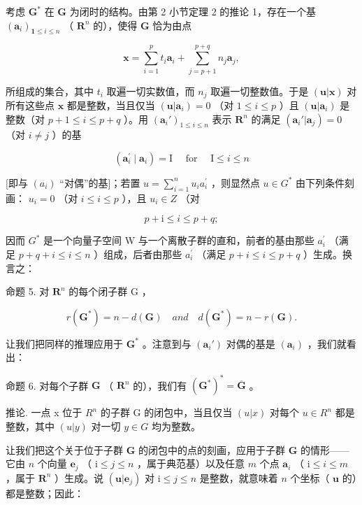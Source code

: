 考虑 \(\mathbf{G}^*\) 在 \(\mathbf{G}\) 为闭时的结构。由第 2 小节定理 2 的推论 1，存在一个基 \((\pmb{a}_i)_{\mathbf{1} \leqslant i \leqslant n}\) （ \(\mathbf{R}^n\) 的），使得 \(\mathbf{G}\) 恰为由点

\[
\boldsymbol {x} = \sum_ {i = 1} ^ {p} t _ {i} \boldsymbol {a} _ {i} + \sum_ {j = p + 1} ^ {p + q} n _ {j} \boldsymbol {a} _ {j},
\]

所组成的集合，其中 \(t_i\) 取遍一切实数值，而 \(n_j\) 取遍一切整数值。于是 \((\boldsymbol{u}|\boldsymbol{x})\) 对所有这些点 \(\boldsymbol{x}\) 都是整数，当且仅当 \((\boldsymbol{u}|\boldsymbol{a}_i) = 0\) （对 \(1 \leqslant i \leqslant p\) ）且 \((\boldsymbol{u}|\boldsymbol{a}_i)\) 是整数（对 \(p + 1 \leqslant i \leqslant p + q\) ）。用 \((\boldsymbol{a}_i')_{1 \leqslant i \leqslant n}\) 表示 \(\mathbf{R}^n\) 的满足 \((\boldsymbol{a}_i'|\boldsymbol{a}_j) = 0\) （对 \(i \neq j\) ）的基

\[
\left(\boldsymbol {a} _ {i} ^ {\prime} \mid \boldsymbol {a} _ {i}\right) = \mathrm{I} \quad \text { for } \quad \mathrm{I} \leqslant i \leqslant n
\]

{[}即与 \((a_{i})\) “对偶”的基{]}；若置 \(u = \sum_{i=1}^{n} u_{i} a_{i}^{\prime}\) ，则显然点 \(u \in G^{*}\) 由下列条件刻画： \(u_{i} = 0\) （对 \(i \leqslant i \leqslant p\) ），且 \(u_{i} \in Z\) （对

\[
p + \mathrm{i} \leqslant i \leqslant p + q;
\]

因而 \(G^{*}\) 是一个向量子空间 W 与一个离散子群的直和，前者的基由那些 \(a_{i}^{\prime}\) （满足 \(p + q + i \leqslant i \leqslant n\) ）组成，后者由那些 \(a_{i}^{\prime}\) （满足 \(p + i \leqslant i \leqslant p + q\) ）生成。换言之：

命题 5. 对 \(\mathbf{R}^n\) 的每个闭子群 G ，

\[
r (\mathbf {G} ^ {*}) = n - d (\mathbf {G}) \quad a n d \quad d (\mathbf {G} ^ {*}) = n - r (\mathbf {G}).
\]

让我们把同样的推理应用于 \(\mathbf{G}^*\) 。注意到与 \((\pmb{a}_i')\) 对偶的基是 \((\pmb{a}_i)\) ，我们就看出：

命题 6. 对每个子群 \(\mathbf{G}\) （ \(\mathbf{R}^n\) 的），我们有 \((\mathbf{G}^*)^* = \overline{\mathbf{G}}\) 。

推论. 一点 x 位于 \(R^{n}\) 的子群 G 的闭包中，当且仅当 \((u|x)\) 对每个 \(u \in R^{n}\) 都是整数，其中 \((u|y)\) 对一切 \(y \in G\) 均为整数。

让我们把这个关于位于子群 \(\mathbf{G}\) 的闭包中的点的刻画，应用于子群 \(\mathbf{G}\) 的情形——它由 \(n\) 个向量 \(\boldsymbol{e}_j\) （ \(\mathrm{i} \leqslant j \leqslant n\) ，属于典范基）以及任意 \(m\) 个点 \(\boldsymbol{a}_i\) （ \(\mathrm{i} \leqslant i \leqslant m\) ，属于 \(\mathbf{R}^n\) ）生成。说 \((\boldsymbol{u}|\boldsymbol{e}_j)\) 对 \(\mathrm{i} \leqslant j \leqslant n\) 是整数，就意味着 \(n\) 个坐标（ \(\boldsymbol{u}\) 的）都是整数；因此：

